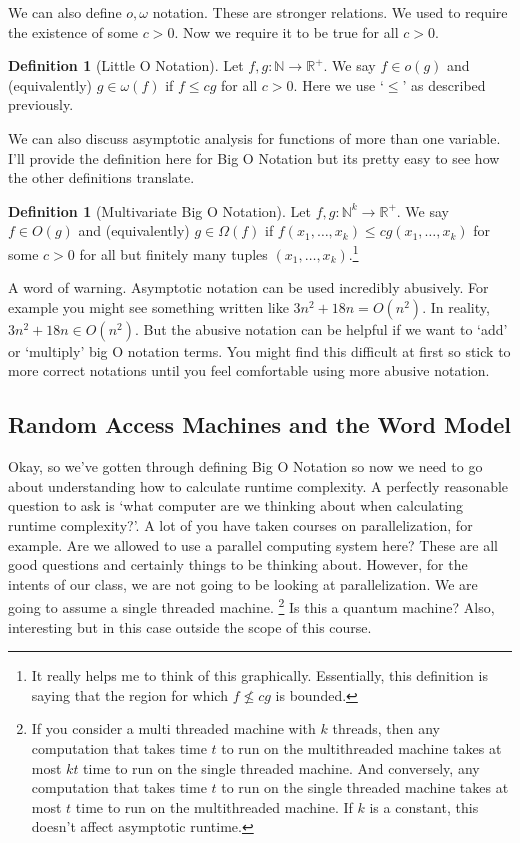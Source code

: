 \documentclass[11pt]{article}
\theoremstyle{plain}
\theoremstyle{definition}
\newtheorem{defn}[thm]{Definition} %
\newcommand{\NN}{\mathbb{N}}
\newcommand{\RR}{\mathbb{R}}
\numberwithin{equation}{section}
\numberwithin{figure}{section}
\begin{document}
\noindent We can also define $o, \omega$ notation. These are stronger relations. We used to require the existence of some $c > 0$. Now we require it to be true for all $c > 0$.

\begin{defn}[Little O Notation]
Let $f, g : \NN \rightarrow \RR^+$. We say $f \in o(g)$ and (equivalently) $g \in \omega(f)$ if $f \leq c g$ for all $c > 0$. Here we use `$\leq$' as described previously.
\end{defn}

\noindent We can also discuss asymptotic analysis for functions of more than one variable. I'll provide the definition here for Big O Notation but its pretty easy to see how the other definitions translate. 

\begin{defn}[Multivariate Big O Notation]
Let $f,g : \NN^k \rightarrow \RR^+$. We say $f \in O(g)$ and (equivalently) $g \in \Omega(f)$ if $f(x_1, \ldots, x_k) \leq c g(x_1, \ldots, x_k)$ for some $c > 0$ for all but finitely many tuples $(x_1, \ldots, x_k)$.\footnote{It really helps me to think of this graphically. Essentially, this definition is saying that the region for which $f \not \leq c g$ is bounded.}
\end{defn}

\noindent A word of warning. Asymptotic notation can be used incredibly abusively. For example you might see something written like $3 n^2 + 18n = O(n^2)$. In reality, $3 n^2 + 18n \in O(n^2)$. But the abusive notation can be helpful if we want to `add' or `multiply' big O notation terms. You might find this difficult at first so stick to more correct notations until you feel comfortable using more abusive notation.

\subsection{Random Access Machines and the Word Model}
Okay, so we've gotten through defining Big O Notation so now we need to go about understanding how to calculate runtime complexity. A perfectly reasonable question to ask is `what computer are we thinking about when calculating runtime complexity?'. A lot of you have taken courses on parallelization, for example. Are we allowed to use a parallel computing system here? These are all good questions and certainly things to be thinking about. However, for the intents of our class, we are not going to be looking at parallelization. We are going to assume a single threaded machine. \footnote{If you consider a multi threaded machine with $k$ threads, then any computation that takes time $t$ to run on the multithreaded machine takes at most $kt$ time to run on the single threaded machine. And conversely, any computation that takes time $t$ to run on the single threaded machine takes at most $t$ time to run on the multithreaded machine. If $k$ is a constant, this doesn't affect asymptotic runtime.} Is this a quantum machine? Also, interesting but in this case outside the scope of this course. \\
\end{document}
